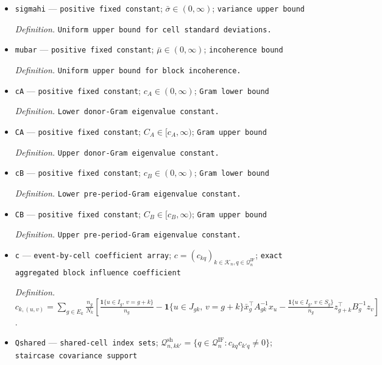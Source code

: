 \documentclass{article}
\begin{document}
\begin{itemize}
  \par\smallskip\noindent\emph{Definition.} \texttt{Uniform lower bound for cell standard deviations.}
  \item \texttt{sigmahi} --- \texttt{positive fixed constant}; \(\bar\sigma\in(0,\infty)\); \texttt{variance upper bound}
  \par\smallskip\noindent\emph{Definition.} \texttt{Uniform upper bound for cell standard deviations.}
  \item \texttt{mubar} --- \texttt{positive fixed constant}; \(\bar\mu\in(0,\infty)\); \texttt{incoherence bound}
  \par\smallskip\noindent\emph{Definition.} \texttt{Uniform upper bound for block incoherence.}
  \item \texttt{cA} --- \texttt{positive fixed constant}; \(c_A\in(0,\infty)\); \texttt{Gram lower bound}
  \par\smallskip\noindent\emph{Definition.} \texttt{Lower donor-\allowbreak{}Gram eigenvalue constant.}
  \item \texttt{CA} --- \texttt{positive fixed constant}; \(C_A\in[c_A,\infty)\); \texttt{Gram upper bound}
  \par\smallskip\noindent\emph{Definition.} \texttt{Upper donor-\allowbreak{}Gram eigenvalue constant.}
  \item \texttt{cB} --- \texttt{positive fixed constant}; \(c_B\in(0,\infty)\); \texttt{Gram lower bound}
  \par\smallskip\noindent\emph{Definition.} \texttt{Lower pre-\allowbreak{}period-\allowbreak{}Gram eigenvalue constant.}
  \item \texttt{CB} --- \texttt{positive fixed constant}; \(C_B\in[c_B,\infty)\); \texttt{Gram upper bound}
  \par\smallskip\noindent\emph{Definition.} \texttt{Upper pre-\allowbreak{}period-\allowbreak{}Gram eigenvalue constant.}
  \item \texttt{c} --- \texttt{event-\allowbreak{}by-\allowbreak{}cell coefficient array}; \(c=(c_{kq})_{k\in\mathcal K_n,q\in\mathcal Q_n^{\mathrm{IF}}}\); \texttt{exact aggregated block influence coefficient}
  \par\smallskip\noindent\emph{Definition.} \(c_{k,(u,v)}=\sum_{g\in E_k}\frac{n_g}{N_k}\left[\frac{\mathbf 1\{u\in I_g,\,v=g+k\}}{n_g}-\mathbf 1\{u\in J_{gk},\,v=g+k\}\bar x_g^\top A_{gk}^{-1}x_u-\frac{\mathbf 1\{u\in I_g,\,v\in S_g\}}{n_g}z_{g+k}^\top B_g^{-1}z_v\right]\).
  \item \texttt{Qshared} --- \texttt{shared-\allowbreak{}cell index sets}; \(\mathcal Q_{n,kk'}^{\mathrm{sh}}=\{q\in\mathcal Q_n^{\mathrm{IF}}:c_{kq}c_{k'q}\ne0\}\); \texttt{staircase covariance support}

\end{itemize}
\end{document}
